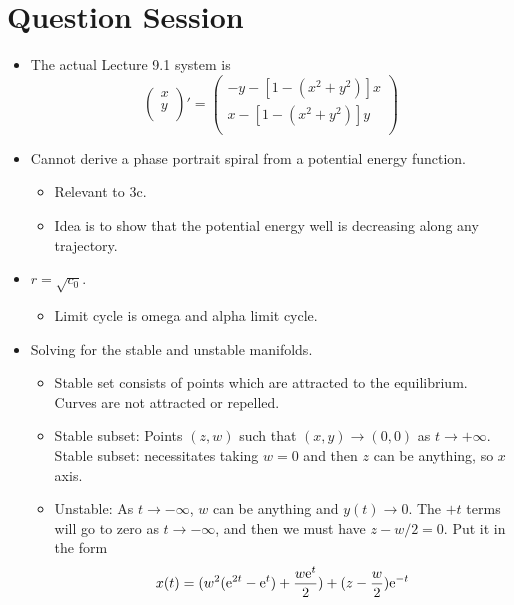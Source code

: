 \documentclass[../notes.tex]{subfiles}
\begin{document}
\section{Question Session}
\begin{itemize}
    \item {}The actual Lecture 9.1 system is
    \begin{equation*}
        \begin{pmatrix}
            x\\
            y\\
        \end{pmatrix}'
        =
        \begin{pmatrix}
            -y-[1-(x^2+y^2)]x\\
            x-[1-(x^2+y^2)]y\\
        \end{pmatrix}
    \end{equation*}
    \item Cannot derive a phase portrait spiral from a potential energy function.
    \begin{itemize}
        \item Relevant to 3c.
        \item Idea is to show that the potential energy well is decreasing along any trajectory.
    \end{itemize}
    \item $r=\sqrt{c_0}$.
    \begin{itemize}
        \item Limit cycle is omega and alpha limit cycle.
    \end{itemize}
    \item Solving for the stable and unstable manifolds.
    \begin{itemize}
        \item Stable set consists of points which are attracted to the equilibrium. Curves are not attracted or repelled.
        \item Stable subset: Points $(z,w)$ such that $(x,y)\to(0,0)$ as $t\to +\infty$. Stable subset: necessitates taking $w=0$ and then $z$ can be anything, so $x$ axis. 
        \item Unstable: As $t\to -\infty$, $w$ can be anything and $y(t) \to 0$. The $+t$ terms will go to zero as $t\to -\infty$, and then we must have $z-w/2=0$. Put it in the form
        \begin{align*}
            x(t) &= (w^2(\e[2t]-\e[t])+\frac{w\e[t]}{2})+(z-\frac{w}{2})\e[-t]\\

\end{align*}
\end{itemize}
\end{itemize}
\end{document}

